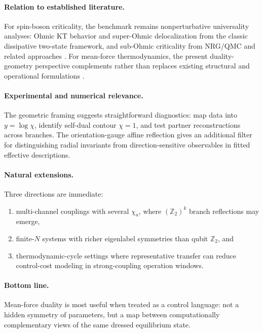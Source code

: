 \paragraph{Relation to established literature.}
For spin-boson criticality, the benchmark remains nonperturbative universality analyses:
Ohmic KT behavior and super-Ohmic delocalization from the classic dissipative two-state framework,
and sub-Ohmic criticality from NRG/QMC and related approaches
\cite{leggettDynamicsDissipativeTwostate1987,weissQuantumDissipativeSystems2012,bullaQuantumPhaseTransitionSubohmic2003,vojtaQuantumPhaseTransitionsSubohmic2005,winterQuantumPhaseTransitionSubohmic2009,bullaNumericalRenormalizationGroup2008}.
For mean-force thermodynamics, the present duality-geometry perspective complements rather than
replaces existing structural and operational formulations
\cite{gelinThermodynamicsSubensembleCanonical2009a,hiltHamiltonianMeanForce2011,talknerColloquiumStatisticalMechanics2020,rivasStrongCouplingThermodynamics2020,burkeStructureHamiltonianMean2024}.

\paragraph{Experimental and numerical relevance.}
The geometric framing suggests straightforward diagnostics:
map data into \(y=\log\chi\), identify self-dual contour \(\chi=1\), and test partner reconstructions
across branches.
The orientation-gauge affine reflection gives an additional filter for distinguishing radial
invariants from direction-sensitive observables in fitted effective descriptions.

\paragraph{Natural extensions.}
Three directions are immediate:
\begin{enumerate}
  \item multi-channel couplings with several \(\chi_a\), where \((\mathbb{Z}_2)^k\) branch reflections
  may emerge,
  \item finite-\(N\) systems with richer eigenlabel symmetries than qubit \(\mathbb{Z}_2\), and
  \item thermodynamic-cycle settings where representative transfer can reduce control-cost modeling in
  strong-coupling operation windows.
\end{enumerate}

\paragraph{Bottom line.}
Mean-force duality is most useful when treated as a control language: not a hidden symmetry of
parameters, but a map between computationally complementary views of the same dressed equilibrium
state.
